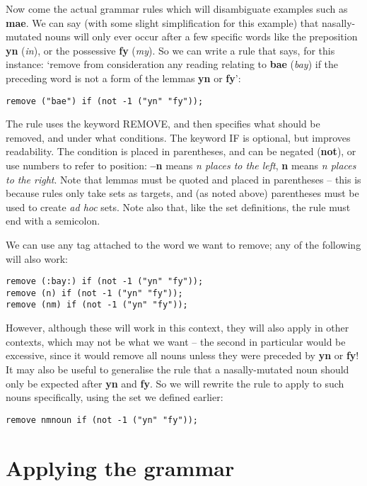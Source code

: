 \documentclass[a4paper,10pt]{article}
\begin{document}
Now come the actual grammar rules which will disambiguate examples such as \textbf{mae}.  We can say (with some slight simplification for this example) that nasally-mutated nouns will only ever occur after a few specific words like the preposition \textbf{yn} (\textit{in}), or the possessive \textbf{fy} (\textit{my}).  So we can write a rule that says, for this instance: `remove from consideration any reading relating to \textbf{bae} (\textit{bay}) if the preceding word is not a form of the lemmas \textbf{yn} or \textbf{fy}':
\begin{Verbatim}[tabsize=4]
remove ("bae") if (not -1 ("yn" "fy"));
\end{Verbatim} 

The rule uses the keyword REMOVE, and then specifies what should be removed, and under what conditions.  The keyword IF is optional, but improves readability.  The condition is placed in parentheses, and can be negated (\textbf{not}), or use numbers to refer to position: \textbf{--n} means \textit{n places to the left}, \textbf{n} means \textit{n places to the right}.  Note that lemmas must be quoted and placed in parentheses -- this is because rules only take sets as targets, and (as noted above) parentheses must be used to create \textit{ad hoc} sets.  Note also that, like the set definitions, the rule must end with a semicolon.

We can use any tag attached to the word we want to remove; any of the following will also work:
\begin{Verbatim}[tabsize=4]
remove (:bay:) if (not -1 ("yn" "fy"));
remove (n) if (not -1 ("yn" "fy"));
remove (nm) if (not -1 ("yn" "fy"));
\end{Verbatim} 

However, although these will work in this context, they will also apply in other contexts, which may not be what we want -- the second in particular would be excessive, since it would remove all nouns unless they were preceded by \textbf{yn} or \textbf{fy}!  It may also be useful to generalise the rule that a nasally-mutated noun should only be expected after \textbf{yn} and \textbf{fy}.  So we will rewrite the rule to apply to such nouns specifically, using the set we defined earlier:
\begin{Verbatim}[tabsize=4]
remove nmnoun if (not -1 ("yn" "fy"));
\end{Verbatim} 

\section{Applying the grammar}
\end{document}
